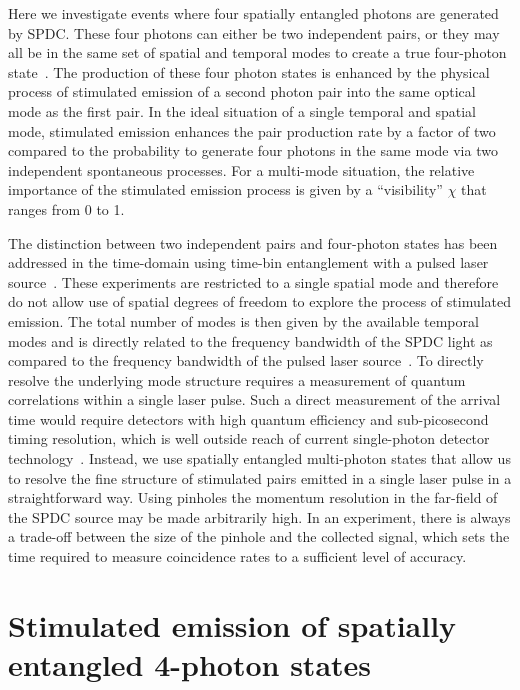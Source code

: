 Here we investigate events where four spatially entangled photons are generated by SPDC. These four photons can either be two independent pairs, or they may all be in the same set of spatial and temporal modes to create a true four-photon state~\cite{Ou1999,Riedmatten2004}. The production of these four photon states is enhanced by the physical process of stimulated emission of a second photon pair into the same optical mode as the first pair. In the ideal situation of a single temporal and spatial mode, stimulated emission enhances the pair production rate by a factor of two compared to the probability to generate four photons in the same mode via two independent spontaneous processes. For a multi-mode situation, the relative importance of the stimulated emission process is given by a ``visibility'' $\chi$ that ranges from 0 to 1.

The distinction between two independent pairs and four-photon states has been addressed in the time-domain using time-bin entanglement with a pulsed laser source~\cite{Ou1999,Riedmatten2004}. These experiments are restricted to a single spatial mode and therefore do not allow use of spatial degrees of freedom to explore the process of stimulated emission. The total number of modes is then given by the available temporal modes and is directly related to the frequency bandwidth of the SPDC light as compared to the frequency bandwidth of the pulsed laser source~\cite{Riedmatten2004}. To directly resolve the underlying mode structure requires a measurement of quantum correlations within a single laser pulse. Such a direct measurement of the arrival time would require detectors with high quantum efficiency and sub-picosecond timing resolution, which is well outside reach of current single-photon detector technology~\cite{Hadfield2009,Eisaman2011}. Instead, we use spatially entangled multi-photon states that allow us to resolve the fine structure of stimulated pairs emitted in a single laser pulse in a straightforward way. Using pinholes the momentum resolution in the far-field of the SPDC source may be made arbitrarily high. In an experiment, there is always a trade-off between the size of the pinhole and the collected signal, which sets the time required to measure coincidence rates to a sufficient level of accuracy.

\section{Stimulated emission of spatially entangled 4-photon states}

